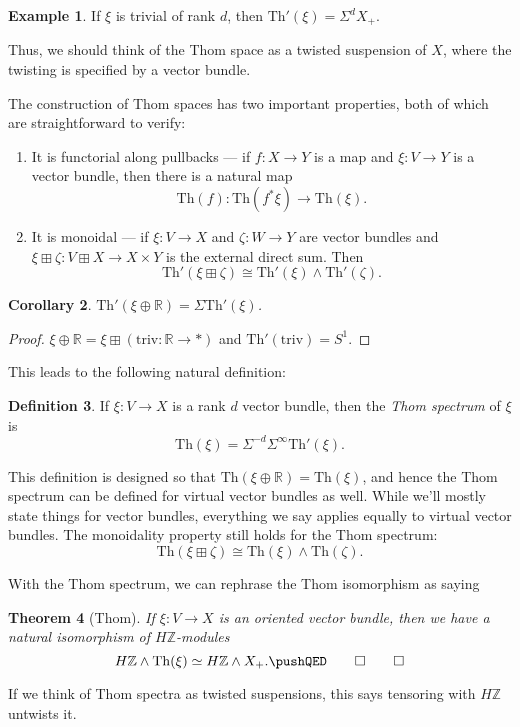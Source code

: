 \documentclass{shortart}
\newtheorem{thm}{Theorem}[section]
\newtheorem{cor}[thm]{Corollary}
\theoremstyle{definition}
\newtheorem{defi}[thm]{Definition}
\newtheorem{eg}[thm]{Example}
\newcommand\Th{\mathrm{Th}}
\newcommand\R{\mathbb{R}}
\newcommand\Z{\mathbb{Z}}
\begin{document}
\begin{eg}
  If $\xi$ is trivial of rank $d$, then $\Th'(\xi) = \Sigma^d X_+$.
\end{eg}
Thus, we should think of the Thom space as a twisted suspension of $X$, where the twisting is specified by a vector bundle.

The construction of Thom spaces has two important properties, both of which are straightforward to verify:
\begin{enumerate}
  \item It is functorial along pullbacks --- if $f: X \to Y$ is a map and $\xi: V \to Y$ is a vector bundle, then there is a natural map
    \[
      \Th(f): \Th(f^* \xi) \to \Th(\xi).
    \]
  \item It is monoidal --- if $\xi: V \to X$ and $\zeta: W \to Y$ are vector bundles and $\xi \boxplus \zeta: V \boxplus X \to X \times Y$ is the external direct sum. Then
  \[
    \Th'(\xi \boxplus \zeta) \cong \Th'(\xi) \wedge \Th'(\zeta).
  \]
\end{enumerate}

\begin{cor}
  $\Th'(\xi \oplus \R) = \Sigma \Th'(\xi)$.
\end{cor}

\begin{proof}
  $\xi \oplus \R = \xi \boxplus (\mathrm{triv}: \R \to *)$ and $\Th'(\mathrm{triv}) = S^1$.
\end{proof}

This leads to the following natural definition:
\begin{defi}
  If $\xi: V \to X$ is a rank $d$ vector bundle, then the \emph{Thom spectrum} of $\xi$ is
  \[
    \Th(\xi) = \Sigma^{-d} \Sigma^\infty \Th'(\xi).
  \]
\end{defi}
This definition is designed so that $\Th(\xi \oplus \R) = \Th(\xi)$, and hence the Thom spectrum can be defined for virtual vector bundles as well. While we'll mostly state things for vector bundles, everything we say applies equally to virtual vector bundles. The monoidality property still holds for the Thom spectrum:
\[
  \Th(\xi \boxplus \zeta) \cong \Th(\xi) \wedge \Th(\zeta).
\]

With the Thom spectrum, we can rephrase the Thom isomorphism as saying
\begin{thm}[Thom]
  If $\xi: V \to X$ is an oriented vector bundle, then we have a natural isomorphism of $H\Z$-modules
  \[
    H\Z \wedge \Th(\xi) \simeq H\Z \wedge X_+.\fakeqed
  \]
\end{thm}
If we think of Thom spectra as twisted suspensions, this says tensoring with $H\Z$ untwists it.
\end{document}

